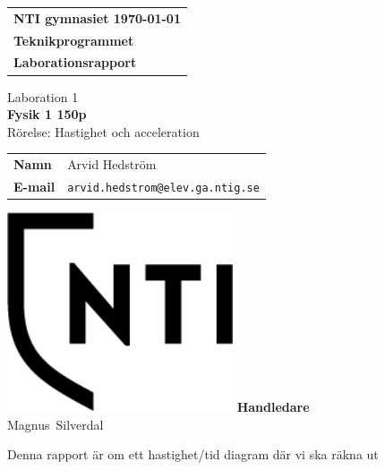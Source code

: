 \documentclass[11p, titlepage, oneside, a4paper]{article}
\makeatletter
\def\inst{Teknikprogrammet}
\def\typeofdoc{Laborationsrapport}
\def\course{Fysik 1 150p}
\def\pretitle{Laboration 1}
\def\title{Rörelse: Hastighet och acceleration}
\def\name{Arvid Hedström}
\def\username{arvid.hedstrom}
\def\email{\username{}@elev.ga.ntig.se}
\def\graders{Magnus Silverdal}
\makeatother
\begin{document}
\begin{titlepage}
		\thispagestyle{empty}
		\begin{large}
			\begin{tabular}{@{}p{\textwidth}@{}}
				\textbf{NTI gymnasiet \hfill \today} \\
				\textbf{\inst} \\
				\textbf{\typeofdoc} \\
			\end{tabular}
		\end{large}
		\vspace{10mm}
		\begin{center}
			\LARGE{\pretitle} \\
			\huge{\textbf{\course}}\\
			\vspace{10mm}
			\LARGE{\title} \\
			\vspace{15mm}
			\begin{large}
				\begin{tabular}{ll}
					\textbf{Namn} & \name \\
					\textbf{E-mail} & \texttt{\email} \\
				\end{tabular}
			\end{large}
			\vfill
            \includegraphics[width=0.5\textwidth]{images/NTI Gymnasiet_Symbol_print_svart.png}
			\vfill
            \large{\textbf{Handledare}}\\
			\mbox{\large{\graders}}
		\end{center}
	\end{titlepage}

    \begin{otherlanguage}{swedish}
	\begin{abstrakt}
        Denna rapport är om ett hastighet/tid diagram där vi ska räkna ut
    \end{abstrakt}
    \end{otherlanguage}
	\tableofcontents
	
\end{document}
